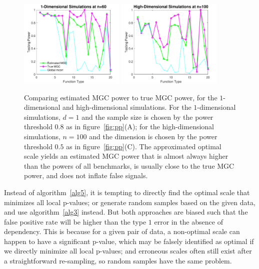 \documentclass[11pt]{article}
\begin{document}
\begin{figure}[htbp]
\centering
\includegraphics[width=0.45\textwidth]{Figures/Fig9}
\includegraphics[width=0.45\textwidth]{Figures/Fig10}
\caption{Comparing estimated MGC power to true MGC power, for the $1$-dimensional and high-dimensional simulations. For the $1$-dimensional simulations, $d=1$ and the sample size is chosen by the power threshold $0.8$ as in figure~\ref{fig:pp}(A); for the high-dimensional simulations, $n=100$ and the dimension is chosen by the power threshold $0.5$ as in figure~\ref{fig:pp}(C). The approximated optimal scale yields an estimated MGC power that is almost always higher than the powers of all benchmarks, is usually close to the true MGC power, and does not inflate false signals.} 
\label{figSimPerm}
\end{figure}
%
%
%
%
Instead of algorithm~\ref{alg5}, it is tempting to directly find the optimal scale that minimizes all local p-values; or generate random samples based on the given data, and use algorithm~\ref{alg3} instead. But both approaches are biased such that the false positive rate will be higher than the type $1$ error in the absence of dependency. This is because for a given pair of data, a non-optimal scale can happen to have a significant p-value, which may be falsely identified as optimal if we directly minimize all local p-values; and erroneous scales often still exist after a straightforward re-sampling, so random samples have the same problem. 
\end{document}
